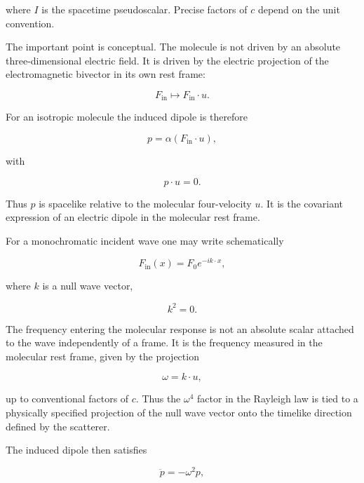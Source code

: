 \documentclass[11pt,a4paper]{article}
\begin{document}
where \(I\) is the spacetime pseudoscalar. Precise factors of \(c\) depend on
the unit convention.

The important point is conceptual. The molecule is not driven by an absolute
three-dimensional electric field. It is driven by the electric projection of
the electromagnetic bivector in its own rest frame:

\begin{equation}
F_{\mathrm{in}} \mapsto F_{\mathrm{in}}\cdot u.
\end{equation}

For an isotropic molecule the induced dipole is therefore

\begin{equation}
p = \alpha (F_{\mathrm{in}}\cdot u),
\end{equation}

with

\begin{equation}
p\cdot u = 0.
\end{equation}

Thus \(p\) is spacelike relative to the molecular four-velocity \(u\). It is
the covariant expression of an electric dipole in the molecular rest frame.

For a monochromatic incident wave one may write schematically

\begin{equation}
F_{\mathrm{in}}(x) = F_0 e^{-ik\cdot x},
\end{equation}

where \(k\) is a null wave vector,

\begin{equation}
k^2=0.
\end{equation}

The frequency entering the molecular response is not an absolute scalar
attached to the wave independently of a frame. It is the frequency measured in
the molecular rest frame, given by the projection

\begin{equation}
\omega = k\cdot u,
\end{equation}

up to conventional factors of \(c\). Thus the \(\omega^4\) factor in the
Rayleigh law is tied to a physically specified projection of the null wave
vector onto the timelike direction defined by the scatterer.

The induced dipole then satisfies

\begin{equation}
\ddot{p} = -\omega^2 p,
\end{equation}
\end{document}
